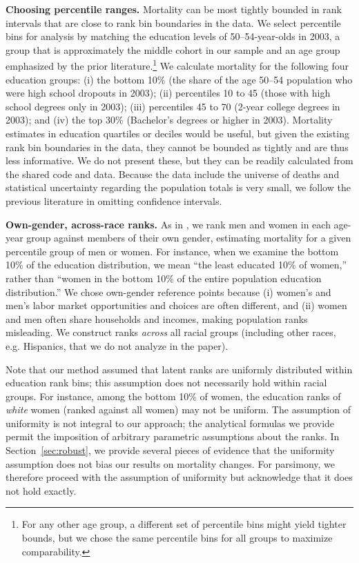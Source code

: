 \documentclass[12pt,letterpaper]{article}
\numberwithin{equation}{section}
\begin{document}
\textbf{Choosing percentile ranges.} Mortality can be most tightly bounded in rank intervals that are close to rank bin boundaries in the data. We select percentile bins for analysis by matching the education levels of 50--54-year-olds in 2003, a group that is approximately the middle cohort in our sample and an age group emphasized by the prior literature.\footnote{For any other age group, a different set of percentile bins might yield tighter bounds, but we chose the same percentile bins for all groups to maximize comparability.} We calculate mortality for the following four education groups: (i) the bottom 10\% (the share of the age 50--54 population who were high school dropouts in 2003); (ii) percentiles 10 to 45 (those with high school degrees only in 2003); (iii) percentiles 45 to 70 (2-year college degrees in 2003); and (iv) the top 30\% (Bachelor's degrees or higher in 2003). Mortality estimates in education quartiles or deciles would be useful, but given the existing rank bin boundaries in the data, they cannot be bounded as tightly and are thus less informative. We do not present these, but they can be readily calculated from the shared code and data. Because the data include the universe of deaths and statistical uncertainty regarding the population totals is very small, we follow the previous literature in omitting confidence intervals.

\textbf{Own-gender, across-race ranks.} As in \citet{Chetty2016b}, we
rank men and women in each age-year group against members of their own
gender, estimating mortality for a given percentile group of men or
women. For instance, when we examine the bottom 10\% of the education
distribution, we mean ``the least educated 10\% of women,'' rather
than ``women in the bottom 10\% of the entire population education
distribution.'' We chose own-gender reference points because (i) women's and men's labor market opportunities and choices are often different, and (ii) women and men often share households and incomes, making population ranks misleading. We construct ranks \textit{across} all racial groups (including other races, e.g. Hispanics, that we do not analyze in the paper). 

Note that our method assumed that latent ranks are uniformly
distributed within education rank bins; this assumption does not
necessarily hold within racial groups. For instance, among the bottom
10\% of women, the education ranks of \textit{white} women (ranked
against all women) may not be uniform. The assumption of uniformity is
not integral to our approach; the analytical formulas we provide
permit the imposition of arbitrary parametric assumptions about the
ranks. In Section~\ref{sec:robust}, we provide several pieces of
evidence that the uniformity assumption does not bias our results on
mortality changes. For parsimony, we therefore proceed with the
assumption of uniformity but acknowledge that it does not hold
exactly. 
\end{document}
